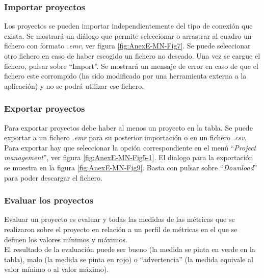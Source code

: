 \subsubsection{Importar proyectos}
Los proyectos se pueden importar independientemente del tipo de conexión que exista. Se mostrará un diálogo que permite seleccionar o arrastrar al cuadro un fichero con formato \textit{.emr}, ver figura \ref{fig:AnexE-MN-Fig7}. Se puede seleccionar otro fichero en caso de haber escogido un fichero no deseado. Una vez se cargue el fichero, pulsar sobre ``Import''. Se mostrará un mensaje de error en caso de que el fichero este corrompido (ha sido modificado por una herramienta externa a la aplicación) y no se podrá utilizar ese fichero.
\subsubsection{Exportar proyectos}
Para exportar proyectos debe haber al menos un proyecto en la tabla.
Se puede exportar a un fichero \textit{.emr} para su posterior importación o en un fichero \textit{.csv}. Para exportar hay que seleccionar la opción correspondiente en el menú ``\textit{Project management}'', ver figura \ref{fig:AnexE-MN-Fig5-1}. El dialogo para la exportación se muestra en la figura \ref{fig:AnexE-MN-Fig9}. Basta con pulsar sobre ``\textit{Download}'' para poder descargar el fichero.
\subsubsection{Evaluar los proyectos}
Evaluar un proyecto es evaluar y todas las medidas de las métricas que se realizaron sobre el proyecto en relación a un perfil de métricas en el que se definen los valores mínimos y máximos.\\
El resultado de la evaluación puede ser bueno (la medida se pinta en verde en la tabla), malo (la medida se pinta en rojo) o ``advertencia'' (la medida equivale al valor mínimo o al valor máximo).

